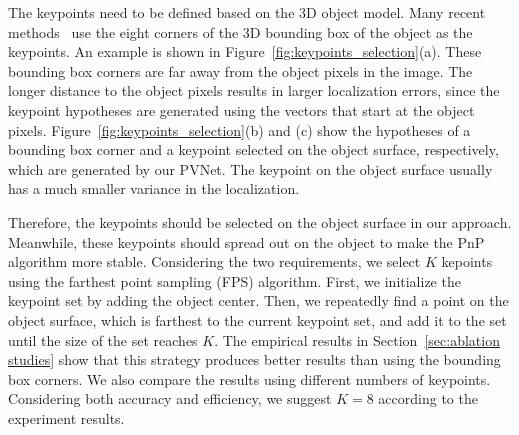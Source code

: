 \documentclass[10pt,twocolumn,letterpaper]{article}
\begin{document}
The keypoints need to be defined based on the 3D object model. Many recent methods~\cite{rad2017bb8, tekin2018real, oberweger2018making} use the eight corners of the 3D bounding box of the object as the keypoints. An example is shown in Figure~\ref{fig:keypoints_selection}(a). These bounding box corners are far away from the object pixels in the image. 
The longer distance to the object pixels results in larger localization errors, since the keypoint hypotheses are generated using the vectors that start at the object pixels.
Figure~\ref{fig:keypoints_selection}(b) and (c) show the hypotheses of a bounding box corner and a keypoint selected on the object surface, respectively, which are generated by our PVNet. The keypoint on the object surface usually has a much smaller variance in the localization. 


Therefore, the keypoints should be selected on the object surface in our approach. Meanwhile, these keypoints should spread out on the object to make the PnP algorithm more stable. Considering the two requirements, we select $K$ kepoints using the farthest point sampling (FPS) algorithm. First, we initialize the keypoint set by adding the object center. Then, we repeatedly find a point on the object surface, which is farthest to the current keypoint set, and add it to the set until the size of the set reaches $K$. The empirical results in Section~\ref{sec:ablation studies} show that this strategy produces better results than using the bounding box corners. We also compare the results using different numbers of keypoints. Considering both accuracy and efficiency, we suggest $K=8$ according to the experiment results.
\end{document}
